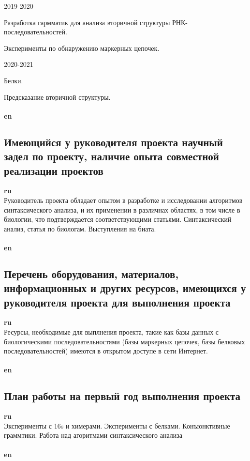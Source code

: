 \documentclass[12pt]{article}  %
\theoremstyle{remark}
\begin{document}
2019-2020

Разработка гармматик для анализа вторичной структуры РНК-последовательностей.

Эксперименты по обнаружению маркерных цепочек.


2020-2021

Белки.

Предсказание вторичной структуры.
\\
\\
\textbf{en}\\


\subsection{Имеющийся у руководителя проекта научный задел по проекту, наличие опыта совместной реализации проектов}

\textbf{ru}\\
Руководитель проекта обладает опытом в разработке и исследовании алгоритмов синтаксического анализа, и их применении в различнах областях, в том числе в биологии, что подтверждается соответствующими статьями.
Синтаксический анализ, статья по биологам. Выступления на биата.
\\
\\
\textbf{en}\\


\subsection{Перечень оборудования, материалов, информационных и других ресурсов, имеющихся у руководителя проекта для выполнения проекта }
\textbf{ru}\\
Ресурсы, необходимые для выплнения проекта, такие как базы данных с биологическими последовательностями (базы маркерных цепочек, базы белковых последовательностей) имеются в открытом доступе в сети Интернет.
\\
\\
\textbf{en}\\


\subsection{План работы на первый год выполнения проекта}

\textbf{ru}\\
Эксперименты с 16s и химерами. Эксперименты с белками. Конъюнктивные граммтики. Работа над агоритмами синтаксического анализа
\\
\\
\textbf{en}\\
\end{document}
